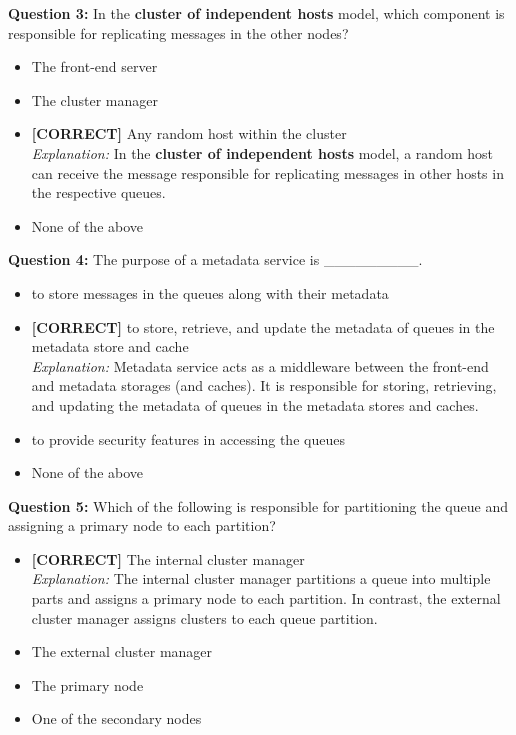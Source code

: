 \textbf{Question 3:} In the \textbf{cluster of independent hosts} model, which component is responsible for replicating messages in the other nodes?
\\[0.2cm]
\begin{itemize}
 \item The front-end server
 \item The cluster manager
 \item \textbf{[CORRECT]} Any random host within the cluster
\\[0.1cm]
\textit{Explanation:} 
In the \textbf{cluster of independent hosts} model, a random host can receive the message responsible for replicating messages in other hosts in the respective queues.
 \item None of the above
\end{itemize}
\vspace{0.3cm}
\noindent
\textbf{Question 4:} The purpose of a metadata service is \_\_\_\_\_\_\_\_\_.
\\[0.2cm]
\begin{itemize}
 \item to store messages in the queues along with their metadata
 \item \textbf{[CORRECT]} to store, retrieve, and update the metadata of queues in the metadata store and cache
\\[0.1cm]
\textit{Explanation:} 
Metadata service acts as a middleware between the front-end and metadata storages (and caches). It is responsible for storing, retrieving, and updating the metadata of queues in the metadata stores and caches.
 \item to provide security features in accessing the queues
 \item None of the above
\end{itemize}
\vspace{0.3cm}
\noindent
\textbf{Question 5:} Which of the following is responsible for partitioning the queue and assigning a primary node to each partition?
\\[0.2cm]
\begin{itemize}
 \item \textbf{[CORRECT]} The internal cluster manager
\\[0.1cm]
\textit{Explanation:} 
The internal cluster manager partitions a queue into multiple parts and assigns a primary node to each partition. In contrast, the external cluster manager assigns clusters to each queue partition.
 \item The external cluster manager
 \item The primary node
 \item One of the secondary nodes
\end{itemize}

